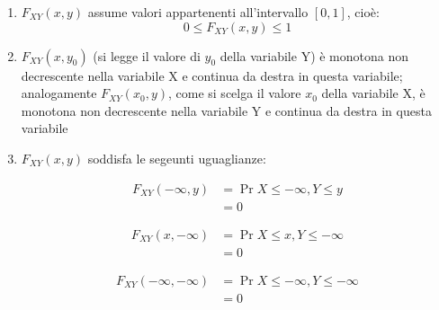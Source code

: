 \begin{enumerate}
    \item $F_{XY} (x, y)$ assume valori appartenenti all'intervallo $[0 , 1]$, cioè: 
        {
            \Large 
            \begin{equation}
                0 \leq F_{XY} (x, y) \leq 1
            \end{equation}
        }

    \item  $F_{XY} (x, y_0)$ (si legge il valore di $y_0$ della variabile Y) è monotona non decrescente nella variabile X e continua da destra in questa variabile; \\ 
       analogamente $F_{XY} (x_0, y) $, come si scelga il valore $x_0$ della variabile X, è monotona non decrescente nella variabile Y e continua da destra in questa variabile 

    \item $F_{XY} (x, y)$ soddisfa le segeunti uguaglianze: 
    
            {
                \Large 
                \begin{equation}
                    \begin{split}
                        F_{XY} (-\infty, y)
                        &= 
                        \Pr{X \leq - \infty, Y \leq y}
                        \\ 
                        &= 
                        0
                    \end{split}
                \end{equation}
            }

            {
                \Large 
                \begin{equation}
                    \begin{split}
                        F_{XY} (x , -\infty)
                        &= 
                        \Pr{X \leq x, Y \leq -\infty}
                        \\ 
                        &= 
                        0
                    \end{split}
                \end{equation}
            } 

            {
                \Large 
                \begin{equation}
                    \begin{split}
                        F_{XY} (-\infty, - \infty)
                        &= 
                        \Pr{X \leq - \infty, Y \leq -\infty}
                        \\ 
                        &= 
                        0
                    \end{split}
                \end{equation}
            }


\end{enumerate}
